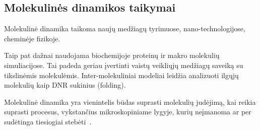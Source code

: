 \subsection{Molekulinės dinamikos taikymai}
\label{sec:molecular_dynamics_applications}

Molekulinė dinamika taikoma naujų medžiagų tyrimuose, nano-technologijose, cheminėje fizikoje.

Taip pat dažnai naudojama biochemijoje proteinų ir makro molekulių simuliacijose.
Tai padeda geriau įvertinti vaistų veikliųjų medžiagų saveiką su tikslinėmis molekulėmis.
Inter-molekuliniai modeliai leidžia analizuoti ilgųjų molekulių kaip DNR sukinius (folding).

Molekulinė dinamika yra vienintelis būdas suprasti molekulių judėjimą, kai reikia suprasti procesus,
vykstančius mikroskopiniame lygyje, kurių neįmanoma ar per sudėtinga tiesiogiai stebėti~\cite{ref_art}.

